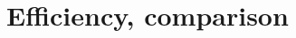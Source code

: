 \documentclass[a4paper]{report}
\begin{document}















\chapter{Efficiency, comparison}




	
\end{document}
